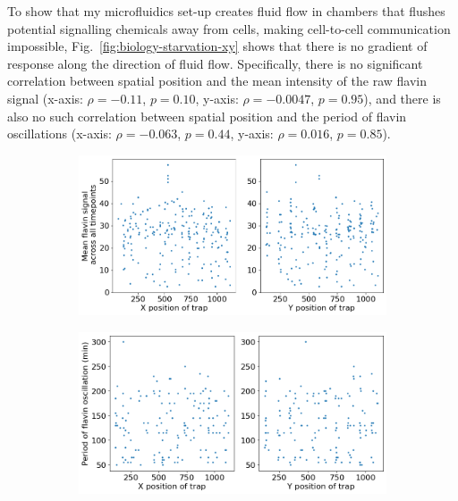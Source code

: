To show that my microfluidics set-up creates fluid flow in chambers that flushes potential signalling chemicals away from cells, making cell-to-cell communication impossible, Fig.\ \ref{fig:biology-starvation-xy} shows that there is no gradient of response along the direction of fluid flow.
Specifically, there is no significant correlation between spatial position and the mean intensity of the raw flavin signal (x-axis: $\rho = -0.11$, $p = 0.10$, y-axis: $\rho = -0.0047$, $p = 0.95$), and there is also no such correlation between spatial position and the period of flavin oscillations (x-axis: $\rho = -0.063$, $p = 0.44$, y-axis: $\rho = 0.016$, $p = 0.85$).

\begin{figure}[hb!]
  \centering
  \begin{subfigure}[htpb]{1.0\textwidth}
   \centering
   \includegraphics[width=\textwidth]{19972_xy_flavin_signal.png}
   \caption{
   }
   \label{fig:biology-starvation-xy-signal}
  \end{subfigure}

  \begin{subfigure}[htpb]{1.0\textwidth}
   \centering
   \includegraphics[width=\textwidth]{19972_xy_flavin_period.png}
   \caption{
   }
   \label{fig:biology-starvation-xy-signal}
  \end{subfigure}


\end{figure}
